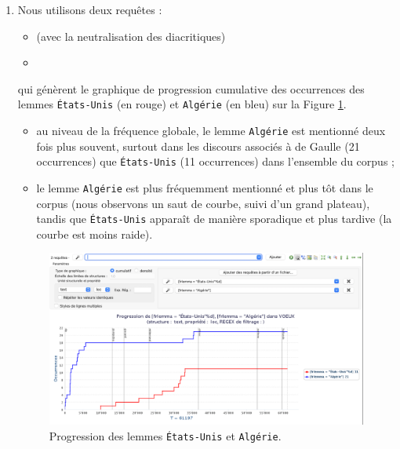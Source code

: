 \documentclass[xcolor={table,usenames,dvipsnames}]{article}
\begin{document}
\begin{enumerate}
\item Nous utilisons deux requêtes : 
\begin{itemize}
	\item {} (avec la neutralisation des diacritiques)
	\item  {}
\end{itemize}

qui génèrent le graphique de progression cumulative des occurrences des lemmes \texttt{États-Unis} (en rouge) et \texttt{Algérie} (en bleu) sur la Figure \ref{fig:usa_algerie}.
\begin{itemize}
	\item au niveau de la fréquence globale, le lemme \texttt{Algérie} est mentionné deux fois plus souvent, surtout dans les discours associés à de Gaulle (21 occurrences) que \texttt{États-Unis} (11 occurrences) dans l'ensemble du corpus ;
	\item le lemme \texttt{Algérie} est plus fréquemment mentionné et plus tôt dans le corpus (nous observons un saut de courbe, suivi d'un grand plateau), tandis que \texttt{États-Unis} apparaît de manière sporadique et plus tardive (la courbe est moins raide).
\end{itemize}

 	 	\begin{figure}[H] %
 		\centering
 		\includegraphics[width=1\linewidth]{img/usa_algerie.png}
 		\caption{Progression des lemmes \texttt{États-Unis} et \texttt{Algérie}.}
 			\label{fig:usa_algerie}
 	\end{figure}
 	

\end{enumerate}
\end{document}
